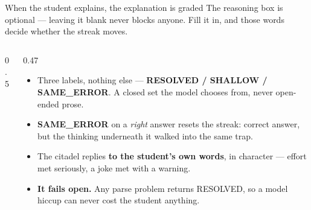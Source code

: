 \documentclass[aspectratio=169,11pt]{beamer}
\newcommand{\goldb}[1]{{\color{gold}\textbf{#1}}}
\newcommand{\tealb}[1]{{\color{teal}\textbf{#1}}}
\newcommand{\lbl}[1]{{\scriptsize\color{cream!62!gmbg}\MakeUppercase{#1}}}
\begin{document}
\begin{frame}{When the student explains, the explanation is graded}
  The reasoning box is optional --- leaving it blank never blocks anyone. Fill it in, and
  those words decide whether the streak moves.\par
  \vspace{0.4em}
  \begin{columns}[T,onlytextwidth]
    \begin{column}{0.5\textwidth}
      \begin{center}
      \end{center}
    \end{column}
    \begin{column}{0.47\textwidth}
      {\scriptsize
      \begin{itemize}\setlength\itemsep{0.45em}
        \item Three labels, nothing else --- \textbf{RESOLVED / SHALLOW / SAME\_ERROR}.
              A closed set the model chooses from, never open-ended prose.
        \item \textbf{SAME\_ERROR} on a \emph{right} answer resets the streak: correct
              answer, but the thinking underneath it walked into the same trap.
        \item The citadel replies \goldb{to the student's own words}, in character ---
              effort met seriously, a joke met with a warning.
        \item \tealb{It fails open.} Any parse problem returns RESOLVED, so a model
              hiccup can never cost the student anything.
      \end{itemize}}
    \end{column}
  \end{columns}
\end{frame}
\end{document}
